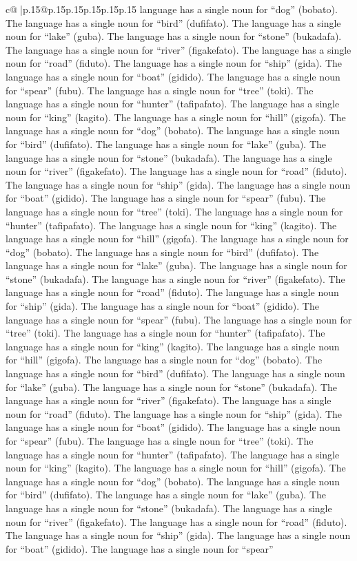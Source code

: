 \documentclass{article}
\begin{document}
{\begin{supertabular}{c@{$\;$}|p{.15\linewidth}@{}p{.15\linewidth}p{.15\linewidth}p{.15\linewidth}p{.15\linewidth}p{.15\linewidth}}
{{{language has a single noun for “dog” (bobato). The language has a single noun for “bird” (dufifato). The language has a single noun for “lake” (guba). The language has a single noun for “stone” (bukadafa). The language has a single noun for “river” (figakefato). The language has a single noun for “road” (fiduto). The language has a single noun for “ship” (gida). The language has a single noun for “boat” (gidido). The language has a single noun for “spear” (fubu). The language has a single noun for “tree” (toki). The language has a single noun for “hunter” (tafipafato). The language has a single noun for “king” (kagito). The language has a single noun for “hill” (gigofa). The language has a single noun for “dog” (bobato). The language has a single noun for “bird” (dufifato). The language has a single noun for “lake” (guba). The language has a single noun for “stone” (bukadafa). The language has a single noun for “river” (figakefato). The language has a single noun for “road” (fiduto). The language has a single noun for “ship” (gida). The language has a single noun for “boat” (gidido). The language has a single noun for “spear” (fubu). The language has a single noun for “tree” (toki). The language has a single noun for “hunter” (tafipafato). The language has a single noun for “king” (kagito). The language has a single noun for “hill” (gigofa). The language has a single noun for “dog” (bobato). The language has a single noun for “bird” (dufifato). The language has a single noun for “lake” (guba). The language has a single noun for “stone” (bukadafa). The language has a single noun for “river” (figakefato). The language has a single noun for “road” (fiduto). The language has a single noun for “ship” (gida). The language has a single noun for “boat” (gidido). The language has a single noun for “spear” (fubu). The language has a single noun for “tree” (toki). The language has a single noun for “hunter” (tafipafato). The language has a single noun for “king” (kagito). The language has a single noun for “hill” (gigofa). The language has a single noun for “dog” (bobato). The language has a single noun for “bird” (dufifato). The language has a single noun for “lake” (guba). The language has a single noun for “stone” (bukadafa). The language has a single noun for “river” (figakefato). The language has a single noun for “road” (fiduto). The language has a single noun for “ship” (gida). The language has a single noun for “boat” (gidido). The language has a single noun for “spear” (fubu). The language has a single noun for “tree” (toki). The language has a single noun for “hunter” (tafipafato). The language has a single noun for “king” (kagito). The language has a single noun for “hill” (gigofa). The language has a single noun for “dog” (bobato). The language has a single noun for “bird” (dufifato). The language has a single noun for “lake” (guba). The language has a single noun for “stone” (bukadafa). The language has a single noun for “river” (figakefato). The language has a single noun for “road” (fiduto). The language has a single noun for “ship” (gida). The language has a single noun for “boat” (gidido). The language has a single noun for “spear” }}}
\end{supertabular}}
\end{document}
